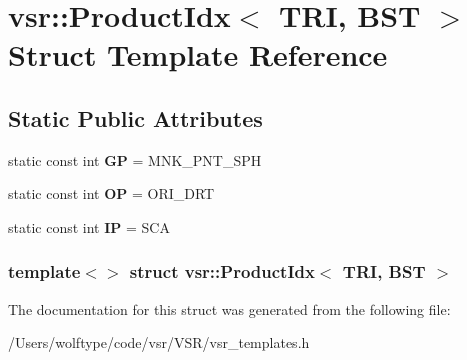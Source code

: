 \hypertarget{structvsr_1_1_product_idx_3_01_t_r_i_00_01_b_s_t_01_4}{\section{vsr\-:\-:Product\-Idx$<$ T\-R\-I, B\-S\-T $>$ Struct Template Reference}
\label{structvsr_1_1_product_idx_3_01_t_r_i_00_01_b_s_t_01_4}
}
\subsection*{Static Public Attributes}
\begin{DoxyCompactItemize}
\item 
\hypertarget{structvsr_1_1_product_idx_3_01_t_r_i_00_01_b_s_t_01_4_a259e374ede84a0e308cab77ff16435ee}{static const int {\bfseries G\-P} = M\-N\-K\-\_\-\-P\-N\-T\-\_\-\-S\-P\-H}\label{structvsr_1_1_product_idx_3_01_t_r_i_00_01_b_s_t_01_4_a259e374ede84a0e308cab77ff16435ee}

\item 
\hypertarget{structvsr_1_1_product_idx_3_01_t_r_i_00_01_b_s_t_01_4_a7ccc703e0e2c0c4214fb00e70eed09d5}{static const int {\bfseries O\-P} = O\-R\-I\-\_\-\-D\-R\-T}\label{structvsr_1_1_product_idx_3_01_t_r_i_00_01_b_s_t_01_4_a7ccc703e0e2c0c4214fb00e70eed09d5}

\item 
\hypertarget{structvsr_1_1_product_idx_3_01_t_r_i_00_01_b_s_t_01_4_a1f23045660ed6f68afacab0e37ef4049}{static const int {\bfseries I\-P} = S\-C\-A}\label{structvsr_1_1_product_idx_3_01_t_r_i_00_01_b_s_t_01_4_a1f23045660ed6f68afacab0e37ef4049}

\end{DoxyCompactItemize}
\subsubsection*{template$<$$>$ struct vsr\-::\-Product\-Idx$<$ T\-R\-I, B\-S\-T $>$}



The documentation for this struct was generated from the following file\-:\begin{DoxyCompactItemize}
\item 
/\-Users/wolftype/code/vsr/\-V\-S\-R/vsr\-\_\-templates.\-h\end{DoxyCompactItemize}
